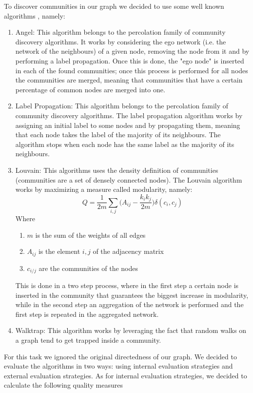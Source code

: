 \documentclass[sigchi]{acmart}
\begin{document}
To discover communities in our graph we decided to use some well known algorithms \cite{barabasiCh9}, namely:
\begin{enumerate}
    \item Angel: This algorithm belongs to the percolation family of community discovery algorithms. It works by considering the ego network (i.e. the network of the neighbours) of a given node, removing the node from it and by performing a label propagation. Once this is done, the "ego node" is inserted in each of the found communities; once this process is performed for all nodes the communities are merged, meaning that communities that have a certain percentage of common nodes are merged into one.
    \item Label Propagation: This algorithm belongs to the percolation family of community discovery algorithms. The label propagation algorithm works by assigning an initial label to some nodes and by propagating them, meaning that each node takes the label of the majority of its neighbours. The algorithm stops when each node has the same label as the majority of its neighbours.
    \item Louvain: This algorithms uses the density definition of communities (communities are a set of densely connected nodes). The Louvain algorithm works by maximizing a measure called modularity, namely:
    $$Q = \frac{1}{2m}\sum_{i,j}\bigg(A_{ij}-\frac{k_i k_j}{2m}\bigg)\delta(c_i,c_j)$$
    Where
    \begin{enumerate}
        \item $m$ is the sum of the weights of all edges
        \item $A_{ij}$ is the element $i,j$ of the adjacency matrix
        \item $c_{i/j}$ are the communities of the nodes
    \end{enumerate}
    This is done in a two step process, where in the first step a certain node is inserted in the community that guarantees the biggest increase in modularity, while in the second step an aggregation of the network is performed and the first step is repeated in the aggregated network.
    \item Walktrap: This algorithm works by leveraging the fact that random walks on a graph tend to get trapped inside a community.
\end{enumerate}
For this task we ignored the original directedness of our graph. We decided to evaluate the algorithms in two ways: using internal evaluation strategies and external evaluation strategies. As for internal evaluation strategies, we decided to calculate the following quality measures
\end{document}
